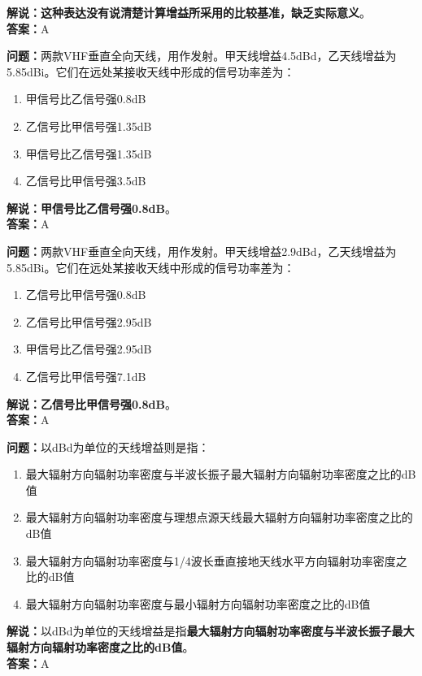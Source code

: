 \textbf{解说：这种表达没有说清楚计算增益所采用的比较基准，缺乏实际意义}。\\\textbf{答案：}A



\textbf{问题：}两款VHF垂直全向天线，用作发射。甲天线增益4.5dBd，乙天线增益为5.85dBi。它们在远处某接收天线中形成的信号功率差为：

\begin{enumerate}[label=\Alph*), leftmargin=1.5cm]
	\item 甲信号比乙信号强0.8dB
	\item 乙信号比甲信号强1.35dB
	\item 甲信号比乙信号强1.35dB
	\item 乙信号比甲信号强3.5dB
\end{enumerate}

\textbf{解说：甲信号比乙信号强0.8dB}。\\\textbf{答案：}A%



\textbf{问题：}两款VHF垂直全向天线，用作发射。甲天线增益2.9dBd，乙天线增益为5.85dBi。它们在远处某接收天线中形成的信号功率差为：

\begin{enumerate}[label=\Alph*), leftmargin=1.5cm]
	\item 乙信号比甲信号强0.8dB
	\item 乙信号比甲信号强2.95dB
	\item 甲信号比乙信号强2.95dB
	\item 乙信号比甲信号强7.1dB
\end{enumerate}

\textbf{解说：乙信号比甲信号强0.8dB}。\\\textbf{答案：}A



\textbf{问题：}以dBd为单位的天线增益则是指：

\begin{enumerate}[label=\Alph*), leftmargin=1.5cm]
	\item 最大辐射方向辐射功率密度与半波长振子最大辐射方向辐射功率密度之比的dB值
	\item 最大辐射方向辐射功率密度与理想点源天线最大辐射方向辐射功率密度之比的dB值
	\item 最大辐射方向辐射功率密度与1/4波长垂直接地天线水平方向辐射功率密度之比的dB值
	\item 最大辐射方向辐射功率密度与最小辐射方向辐射功率密度之比的dB值
\end{enumerate}

\textbf{解说：}以dBd为单位的天线增益是指\textbf{最大辐射方向辐射功率密度与半波长振子最大辐射方向辐射功率密度之比的dB值}。\\\textbf{答案：}A



